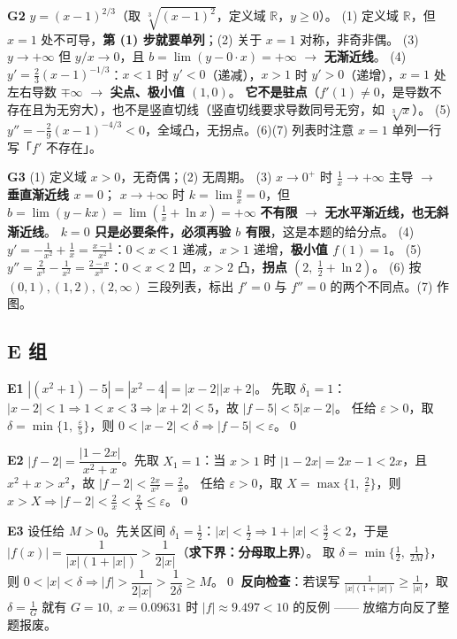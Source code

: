 \documentclass[11pt,a4paper]{ctexart}
\newcommand{\R}{\mathbb{R}}
\newcommand{\eps}{\varepsilon}
\newcommand{\abs}[1]{\left\lvert #1\right\rvert}
\begin{document}
\textbf{G2} $y=(x-1)^{2/3}$（取 $\sqrt[3]{(x-1)^2}$，定义域 $\R$，$y\geq0$）。
(1) 定义域 $\R$，但 $x=1$ 处不可导，\textbf{第 (1) 步就要单列}；(2) 关于 $x=1$ 对称，非奇非偶。
(3) $y\to+\infty$ 但 $y/x\to0$，且 $b=\lim(y-0\cdot x)=+\infty$ $\to$ \textbf{无渐近线}。
(4) $y'=\frac23(x-1)^{-1/3}$：$x<1$ 时 $y'<0$（递减），$x>1$ 时 $y'>0$（递增），$x=1$ 处左右导数 $\mp\infty$ $\to$ \textbf{尖点、极小值 $(1,0)$}。
\textbf{它不是驻点}（$f'(1)\ne0$，是导数不存在且为无穷大），也不是竖直切线（竖直切线要求导数同号无穷，如 $\sqrt[3]{x}$）。
(5) $y''=-\frac29(x-1)^{-4/3}<0$，全域凸，无拐点。(6)(7) 列表时注意 $x=1$ 单列一行写「$f'$ 不存在」。

\textbf{G3} (1) 定义域 $x>0$，无奇偶；(2) 无周期。
(3) $x\to0^+$ 时 $\frac1x\to+\infty$ 主导 $\to$ \textbf{垂直渐近线 $x=0$}；
$x\to+\infty$ 时 $k=\lim\frac yx=0$，但 $b=\lim(y-kx)=\lim\left(\frac1x+\ln x\right)=+\infty$ \textbf{不有限} $\to$ \textbf{无水平渐近线，也无斜渐近线}。
\textbf{$k=0$ 只是必要条件，必须再验 $b$ 有限}，这是本题的给分点。
(4) $y'=-\frac1{x^2}+\frac1x=\frac{x-1}{x^2}$：$0<x<1$ 递减，$x>1$ 递增，\textbf{极小值 $f(1)=1$}。
(5) $y''=\frac2{x^3}-\frac1{x^2}=\frac{2-x}{x^3}$：$0<x<2$ 凹，$x>2$ 凸，\textbf{拐点 $(2,\ \frac12+\ln2)$}。
(6) 按 $(0,1),(1,2),(2,\infty)$ 三段列表，标出 $f'=0$ 与 $f''=0$ 的两个不同点。(7) 作图。

\subsection{E 组}

\textbf{E1} $\abs{(x^2+1)-5}=\abs{x^2-4}=\abs{x-2}\abs{x+2}$。
先取 $\delta_1=1$：$\abs{x-2}<1\Rightarrow 1<x<3\Rightarrow\abs{x+2}<5$，故 $\abs{f-5}<5\abs{x-2}$。
任给 $\eps>0$，取 $\delta=\min\{1,\ \frac\eps5\}$，则 $0<\abs{x-2}<\delta\Rightarrow\abs{f-5}<\eps$。\qed

\textbf{E2} $\abs{f-2}=\dfrac{\abs{1-2x}}{x^2+x}$。先取 $X_1=1$：当 $x>1$ 时 $\abs{1-2x}=2x-1<2x$，且 $x^2+x>x^2$，故 $\abs{f-2}<\frac{2x}{x^2}=\frac2x$。
任给 $\eps>0$，取 $X=\max\{1,\ \frac2\eps\}$，则 $x>X\Rightarrow\abs{f-2}<\frac2x<\frac2X\leq\eps$。\qed

\textbf{E3} 设任给 $M>0$。先关区间 $\delta_1=\frac12$：$\abs{x}<\frac12\Rightarrow 1+\abs{x}<\frac32<2$，于是
$\abs{f(x)}=\dfrac1{\abs x(1+\abs x)}>\dfrac1{2\abs x}$（\textbf{求下界：分母取上界}）。
取 $\delta=\min\{\frac12,\ \frac1{2M}\}$，则 $0<\abs x<\delta\Rightarrow\abs f>\dfrac1{2\abs x}>\dfrac1{2\delta}\geq M$。\qed
\textbf{反向检查}：若误写 $\frac1{|x|(1+|x|)}\geq\frac1{|x|}$，取 $\delta=\frac1G$ 就有 $G=10,\ x=0.09631$ 时 $\abs f\approx9.497<10$ 的反例 —— 放缩方向反了整题报废。
\end{document}
